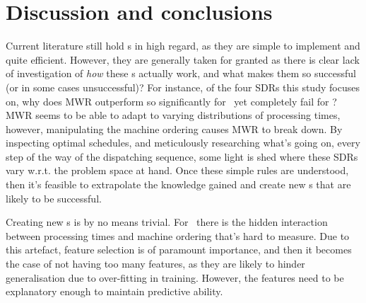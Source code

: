 \documentclass[smallextended]{svjour3}
\begin{document}


\section{Discussion and conclusions}\label{sec:con}
Current literature still hold \sdr s in high regard, 
as they are simple to implement and quite efficient. 
However, they are generally taken for granted as there is clear lack of 
investigation of \emph{how} these \dr s actually work, and what 
makes them so successful (or in some cases unsuccessful)? 
For instance, of the four SDRs this study focuses on, why does MWR outperform 
so significantly for \jsp\, yet completely fail for \fsp? 
MWR seems to be able to adapt to varying distributions of processing times, 
however, manipulating the machine ordering causes MWR to break down. 
By inspecting optimal schedules, and meticulously researching what's going on, 
every step of the way of the dispatching sequence, some light is shed where 
these SDRs vary w.r.t. the problem space at hand. 
Once these simple rules are understood, then it's feasible to extrapolate the 
knowledge gained and create new \cdr s that are likely to be 
successful. 

Creating new \dr s is by no means trivial. For \jsp\ there is 
the hidden interaction between processing times and machine ordering that's 
hard to measure.
Due to this artefact, feature selection is of paramount importance, and then it 
becomes the case of not having too many features, as they are likely to hinder 
generalisation due to over-fitting in training. However, the features need to 
be explanatory enough to maintain predictive ability. 
\end{document}
